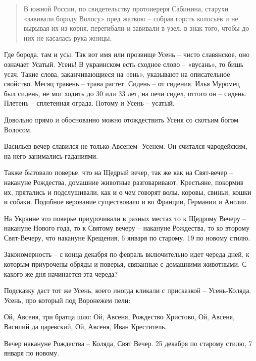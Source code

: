 \begin{quotation}
В южной России, по свидетельству протоиереря Сабинина, старухи «завивали бороду Волосу» пред жатвою – собрав горсть колосьев и не вырывая их из корня, перегибали и завивали в узел, в знак того, чтобы до них не касалась рука жницы.
\end{quotation}

   Где борода, там и усы. Так вот имя или прозвище Усень – чисто славянское, оно означает Усатый. Усень! В украинском есть сходное слово – «вусань», то бишь усач. Такие слова, заканчивающиеся на «ень», указывают на описательное свойство. Месяц травень – трава растет. Сидень – от сидения. Илья Муромец был сидень, не мог ходить до 30 или 33 лет, на печи сидел, оттого он – сидень. Плетень – сплетенная ограда. Потому и Усень – усатый.

   Довольно прямо и обоснованно можно отождествить Усеня со скотьим богом Волосом.

   Васильев вечер славился не только Авсенем- Усенем. Он считался чародейским, на него занимались гаданиями.

   Также бытовало поверье, что на Щедрый вечер, так же как на Свят-вечер – накануне Рождества, домашние животные разговаривают. Крестьяне, покормив их, прятались и подслушивали, как и о чем говорят волы, коровы, свиньи, кошки и собаки. Подобное верование существовало и во Франции, Германии и Англии. 

   На Украине это поверье приурочивали в разных местах то к Щедрому Вечеру – накануне Нового года, то к Святому вечеру – накануне Рождества, то ко второму Свят-Вечеру, что накануне Крещения, 6 января по старому, 19 по новому стилю.

   Закономерность – с конца декабря по февраль включительно идет череда дней, к которым приурочены обряды и поверья, связанные с домашними животными. С какого же дня начинается эта череда?

   Подсказку даст тот же Усень, коего иногда кликали с присказкой – Усень-Коляда. Усень, про который под Воронежем пели: 

\noindent
Ой, Авсеня, три братца шло:\newline
 Ой, Авсеня, Рождество Христово, \newline
Ой, Авсеня, Василий да царевский, \newline
Ой, Авсеня, Иван Креститель.\newline

    Вечер накануне Рождества – Коляда, Свят Вечер. 25 декабря по старому стилю, 7 января по новому. 

